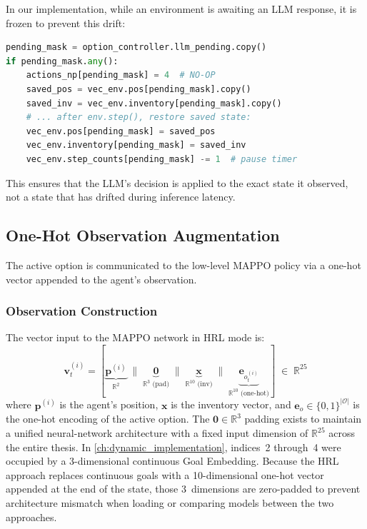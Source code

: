 In our implementation, while an environment is awaiting an LLM response,
it is frozen to prevent this drift:
\begin{lstlisting}[style=code, language=Python, caption={Environment freezing for pending queries.}, label={lst:env_freeze}]
pending_mask = option_controller.llm_pending.copy()
if pending_mask.any():
    actions_np[pending_mask] = 4  # NO-OP
    saved_pos = vec_env.pos[pending_mask].copy()
    saved_inv = vec_env.inventory[pending_mask].copy()
    # ... after env.step(), restore saved state:
    vec_env.pos[pending_mask] = saved_pos
    vec_env.inventory[pending_mask] = saved_inv
    vec_env.step_counts[pending_mask] -= 1  # pause timer
\end{lstlisting}

This ensures that the LLM's decision is applied to the exact state
it observed, not a state that has drifted during inference latency.

\subsection{One-Hot Observation Augmentation}
\label{sec:onehot_aug}

The active option is communicated to the low-level MAPPO policy via
a one-hot vector appended to the agent's observation.

\subsubsection{Observation Construction}

The vector input to the MAPPO network in HRL mode is:
\begin{equation}
\label{eq:hrl_obs}
    \mathbf{v}_t^{(i)}
    =
    \left[
        \underbrace{\mathbf{p}^{(i)}}_{\mathbb{R}^2}
        \;\Big\|\;
        \underbrace{\mathbf{0}}_{\mathbb{R}^3\text{ (pad)}}
        \;\Big\|\;
        \underbrace{\mathbf{x}}_{\mathbb{R}^{10}\text{ (inv)}}
        \;\Big\|\;
        \underbrace{\mathbf{e}_{o_t^{(i)}}}_{\mathbb{R}^{10}\text{ (one-hot)}}
    \right]
    \;\in\; \mathbb{R}^{25}
\end{equation}
where $\mathbf{p}^{(i)}$ is the agent's position,
$\mathbf{x}$ is the inventory vector, and
$\mathbf{e}_{o}\in\{0,1\}^{|\mathcal{O}|}$ is the one-hot encoding
of the active option.
The $\mathbf{0} \in \mathbb{R}^3$ padding exists to maintain a unified
neural-network architecture with a fixed input dimension of
$\mathbb{R}^{25}$ across the entire thesis.
In \cref{ch:dynamic_implementation}, indices~2 through~4 were occupied
by a 3-dimensional continuous Goal Embedding.
Because the HRL approach replaces continuous goals with a
10-dimensional one-hot vector appended at the end of the state, those
3~dimensions are zero-padded to prevent architecture mismatch when
loading or comparing models between the two approaches.


